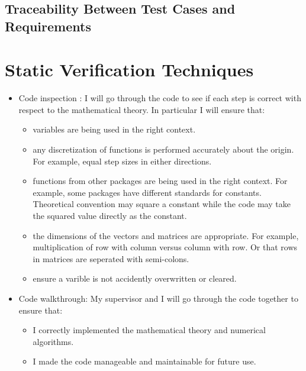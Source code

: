 \documentclass[12pt, titlepage]{article}
\begin{document}
\subsection{Traceability Between Test Cases and Requirements}


\section{Static Verification Techniques}


\begin{itemize}
	\item Code inspection : I will 
	go through the code to see if each step is correct with respect to the
	mathematical theory. In particular I will ensure that: 
	\begin{itemize}
		\item variables are being used in the right context. 
		\item any discretization of functions is performed accurately about the 
		origin. For example, equal step sizes in either directions. 
		\item functions from other packages are being used in the right 
		context. For example, some packages have different standards for 
		constants. Theoretical convention may square a constant while the code 
		may take the squared value directly as the constant. 
		\item the dimensions of the vectors and matrices are appropriate. For 
		example, multiplication of row with column versus column with row. Or 
		that rows in matrices are seperated with semi-colons. 
		\item ensure a varible is not accidently overwritten or cleared. 
	\end{itemize} 
	\item Code walkthrough: My supervisor and I will go through the code 
	together to ensure that: 
	\begin{itemize}
		\item I correctly implemented the mathematical theory and numerical 
		algorithms.
		\item I made the code manageable and maintainable for future use.
	\end{itemize}
\end{itemize}
				
\end{document}
